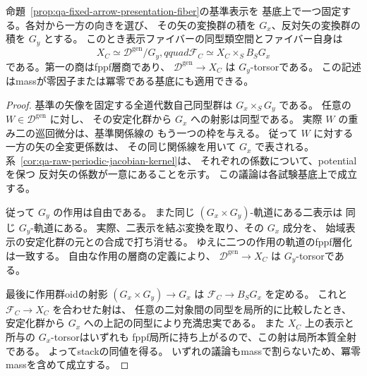 \begin{corollary}[一つの矢像を固定した表示ファイバーの中立化]
\label{cor:qa-fixed-arrow-neutral-gerbe}
命題~\ref{prop:qa-fixed-arrow-presentation-fiber}の基準表示を
基底上で一つ固定する。各対から一方の向きを選び、
その矢の変換群の積を $G_x$、反対矢の変換群の積を $G_y$ とする。
このとき表示ファイバーの同型類空間とファイバー自身は
\[
 X_C\simeq \mathscr D^{\mathrm{gen}}/G_y,qquad
 \mathscr F_C\simeq X_C\times_S B_SG_x
\]
である。第一の商はfppf層商であり、
$\mathscr D^{\mathrm{gen}}\to X_C$ は $G_y$-torsorである。
この記述はmassが零因子または冪零である基底にも適用できる。
\end{corollary}
\begin{proof}
基準の矢像を固定する全道代数自己同型群は
$G_x\times_S G_y$ である。
任意の $W\in\mathscr D^{\mathrm{gen}}$ に対し、
その安定化群から $G_x$ への射影は同型である。
実際 $W$ の重み二の巡回微分は、基準関係線の
もう一つの枠を与える。
従って $W$ に対する一方の矢の全変更係数は、
その同じ関係線を用いて $G_x$ で表される。
系~\ref{cor:qa-raw-periodic-jacobian-kernel}は、
それぞれの係数について、potentialを保つ
反対矢の係数が一意にあることを示す。
この議論は各試験基底上で成立する。

従って $G_y$ の作用は自由である。
また同じ $(G_x\times G_y)$-軌道にある二表示は
同じ $G_y$-軌道にある。
実際、二表示を結ぶ変換を取り、その $G_x$ 成分を、
始域表示の安定化群の元との合成で打ち消せる。
ゆえに二つの作用の軌道のfppf層化は一致する。
自由な作用の層商の定義により、
$\mathscr D^{\mathrm{gen}}\to X_C$ は $G_y$-torsorである。

最後に作用群oidの射影
$(G_x\times G_y)\to G_x$ は
$\mathscr F_C\to B_SG_x$ を定める。
これと $\mathscr F_C\to X_C$ を合わせた射は、
任意の二対象間の同型を局所的に比較したとき、
安定化群から $G_x$ への上記の同型により充満忠実である。
また $X_C$ 上の表示と所与の $G_x$-torsorはいずれも
fppf局所に持ち上がるので、この射は局所本質全射である。
よってstackの同値を得る。
いずれの議論もmassで割らないため、冪零massを含めて成立する。
\end{proof}

